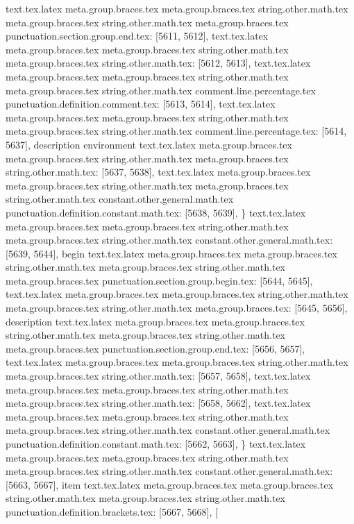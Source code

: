 {{{{{{{{{{{{{{{{{{{{{{{{{{{{{{{{{{{{{{{{{{{{{{{{{{{{{{{{{{{{{{{{{{{{{{{{{{{{{{{{{{{{{{{{{{{{{{{{{{{{{{{{{{{{{{{{{{{{{{{{{{{{{{{{{{{{{{{{{{{{{{{{{{{{{{{{{{text.tex.latex meta.group.braces.tex meta.group.braces.tex string.other.math.tex meta.group.braces.tex string.other.math.tex meta.group.braces.tex punctuation.section.group.end.tex: [5611, 5612], {}}
text.tex.latex meta.group.braces.tex meta.group.braces.tex string.other.math.tex meta.group.braces.tex string.other.math.tex: [5612, 5613], {
}
text.tex.latex meta.group.braces.tex meta.group.braces.tex string.other.math.tex meta.group.braces.tex string.other.math.tex comment.line.percentage.tex punctuation.definition.comment.tex: [5613, 5614], {%
text.tex.latex meta.group.braces.tex meta.group.braces.tex string.other.math.tex meta.group.braces.tex string.other.math.tex comment.line.percentage.tex: [5614, 5637], {description environment}
text.tex.latex meta.group.braces.tex meta.group.braces.tex string.other.math.tex meta.group.braces.tex string.other.math.tex: [5637, 5638], {
}
text.tex.latex meta.group.braces.tex meta.group.braces.tex string.other.math.tex meta.group.braces.tex string.other.math.tex constant.other.general.math.tex punctuation.definition.constant.math.tex: [5638, 5639], {\}
text.tex.latex meta.group.braces.tex meta.group.braces.tex string.other.math.tex meta.group.braces.tex string.other.math.tex constant.other.general.math.tex: [5639, 5644], {begin}
text.tex.latex meta.group.braces.tex meta.group.braces.tex string.other.math.tex meta.group.braces.tex string.other.math.tex meta.group.braces.tex punctuation.section.group.begin.tex: [5644, 5645], {{}
text.tex.latex meta.group.braces.tex meta.group.braces.tex string.other.math.tex meta.group.braces.tex string.other.math.tex meta.group.braces.tex: [5645, 5656], {description}
text.tex.latex meta.group.braces.tex meta.group.braces.tex string.other.math.tex meta.group.braces.tex string.other.math.tex meta.group.braces.tex punctuation.section.group.end.tex: [5656, 5657], {}}
text.tex.latex meta.group.braces.tex meta.group.braces.tex string.other.math.tex meta.group.braces.tex string.other.math.tex: [5657, 5658], {
}
text.tex.latex meta.group.braces.tex meta.group.braces.tex string.other.math.tex meta.group.braces.tex string.other.math.tex: [5658, 5662], {    }
text.tex.latex meta.group.braces.tex meta.group.braces.tex string.other.math.tex meta.group.braces.tex string.other.math.tex constant.other.general.math.tex punctuation.definition.constant.math.tex: [5662, 5663], {\}
text.tex.latex meta.group.braces.tex meta.group.braces.tex string.other.math.tex meta.group.braces.tex string.other.math.tex constant.other.general.math.tex: [5663, 5667], {item}
text.tex.latex meta.group.braces.tex meta.group.braces.tex string.other.math.tex meta.group.braces.tex string.other.math.tex punctuation.definition.brackets.tex: [5667, 5668], {[}
}}}}}}}}}}}}}}}}}}}}}}}}}}}}}}}}}}}}}}}}}}}}}}}}}}}}}}}}}}}}}}}}}}}}}}}}}}}}}}}}}}}}}}}}}}}}}}}}}}}}}}}}}}}}}}}}}}}}}}}}}}}}}}}}}}}}}}}}}}}}}}}}}}}}}}}}}}}}
